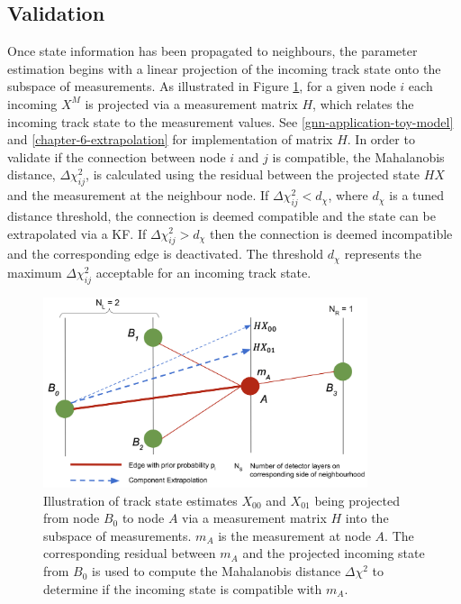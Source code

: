 \subsection{Validation}
Once state information has been propagated to neighbours, the parameter estimation begins with a linear projection of the incoming track state onto the subspace of measurements. As illustrated in Figure \ref{fig:extrapolation}, for a given node $i$ each incoming $X^M$ is projected via a measurement matrix $H$, which relates the incoming track state to the measurement values. See \ref{gnn-application-toy-model} and \ref{chapter-6-extrapolation} for implementation of matrix $H$. In order to validate if the connection between node $i$ and $j$ is compatible, the Mahalanobis distance, $\Delta \chi^{2}_{ij}$, is calculated using the residual between the projected state $HX$ and the measurement at the neighbour node. If $\Delta \chi^{2}_{ij} < d_{\chi}$, where $d_{\chi}$ is a tuned distance threshold, the connection is deemed compatible and the state can be extrapolated via a KF. If $\Delta \chi^{2}_{ij} > d_{\chi}$ then the connection is deemed incompatible and the corresponding edge is deactivated. The threshold $d_{\chi}$ represents the maximum $\Delta \chi^{2}_{ij}$ acceptable for an incoming track state.

\begin{figure}[htbp]
        \centering
        \includegraphics[width=0.85\textwidth]{images/5-gnn-algorithm/gnn-extrapolation.png}
        \caption{Illustration of track state estimates $X_{00}$ and $X_{01}$ being projected from node $B_0$ to node $A$ via a measurement matrix $H$ into the subspace of measurements. $m_A$ is the measurement at node $A$. The corresponding residual between $m_A$ and the projected incoming state from $B_0$ is used to compute the Mahalanobis distance $\Delta \chi^{2}$ to determine if the incoming state is compatible with $m_A$.}
        \label{fig:extrapolation}%
\end{figure}


